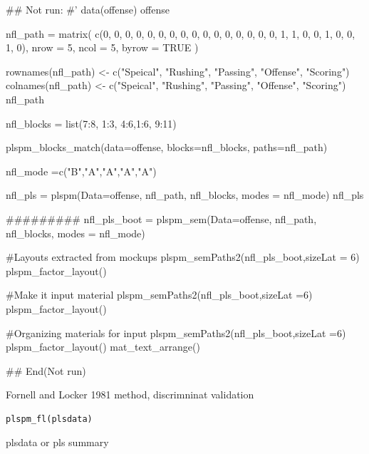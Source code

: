 \documentclass[a4paper]{book}
\begin{document}
\begin{Examples}
\begin{ExampleCode}

## Not run: 
#'
data(offense)
offense %

nfl_path = matrix(
  c(0, 0, 0, 0, 0,
    0, 0, 0, 0, 0,
    0, 0, 0, 0, 0,
    0, 1, 1, 0, 0,
    1, 0, 0, 1, 0),
  nrow = 5, ncol = 5, byrow = TRUE )

rownames(nfl_path) <- c("Speical", "Rushing", "Passing", "Offense", "Scoring")
colnames(nfl_path) <- c("Speical", "Rushing", "Passing", "Offense", "Scoring")
nfl_path

nfl_blocks = list(7:8, 1:3, 4:6,1:6, 9:11)

plspm_blocks_match(data=offense, blocks=nfl_blocks,
                   paths=nfl_path)

nfl_mode =c("B","A","A","A","A")

nfl_pls = plspm(Data=offense, nfl_path, nfl_blocks, modes = nfl_mode)
nfl_pls%

#########
nfl_pls_boot = plspm_sem(Data=offense, nfl_path, nfl_blocks, modes = nfl_mode)

#Layouts extracted from mockups
plspm_semPaths2(nfl_pls_boot,sizeLat = 6)%
  plspm_factor_layout()

#Make it input material
plspm_semPaths2(nfl_pls_boot,sizeLat =6)%
  plspm_factor_layout() %

#Organizing materials for input
plspm_semPaths2(nfl_pls_boot,sizeLat =6)%
  plspm_factor_layout() %
  mat_text_arrange()

## End(Not run)



\end{ExampleCode}
\end{Examples}
%
\begin{Description}
Fornell and Locker 1981 method, discrimninat validation
\end{Description}
%
\begin{Usage}
\begin{verbatim}
plspm_fl(plsdata)
\end{verbatim}
\end{Usage}
%
\begin{Arguments}
\begin{ldescription}
\item[\code{plsdata}] plsdata or pls summary
\end{ldescription}
\end{Arguments}
\end{document}
